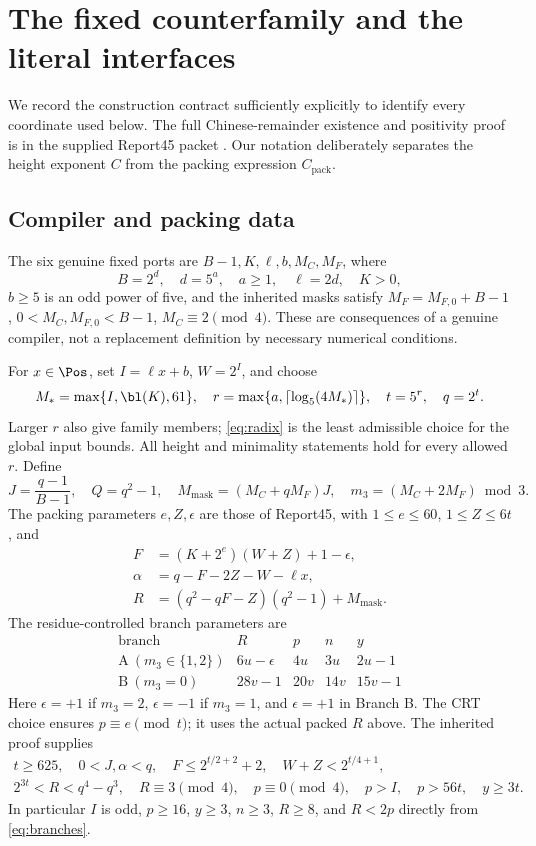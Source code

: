 \section{The fixed counterfamily and the literal interfaces}
\label{sec:setup}
We record the construction contract sufficiently explicitly to identify
every coordinate used below. The full Chinese-remainder existence and
positivity proof is in the supplied Report45 packet \cite{report45,base}.
Our notation deliberately separates the height exponent $C$ from the
packing expression $C_{\mathrm{pack}}$.

\subsection{Compiler and packing data}
The six genuine fixed ports are $B-1,K,\ell,b,M_C,M_F$, where
\[
 B=2^d,\quad d=5^a,\quad a\ge1,\quad \ell=2d,\quad K>0,
\]
$b\ge5$ is an odd power of five, and the inherited masks satisfy
$M_F=M_{F,0}+B-1$, $0<M_C,M_{F,0}<B-1$, $M_C\equiv2\pmod4$.
These are consequences of a genuine compiler, not a replacement
definition by necessary numerical conditions.

For $x\in\Pos$, set $I=\ell x+b$, $W=2^I$, and choose
\begin{equation}\label{eq:radix}
 M_*=\max\{I,\bl(K),61\},\quad
 r=\max\{a,\lceil\log_5(4M_*)\rceil\},\quad t=5^r,\quad q=2^t.
\end{equation}
Larger $r$ also give family members; \eqref{eq:radix} is the least
admissible choice for the global input bounds. All height and minimality
statements hold for every allowed $r$. Define
\[
 J=\frac{q-1}{B-1},\quad Q=q^2-1,\quad
 M_{\mathrm{mask}}=(M_C+qM_F)J,\quad m_3=(M_C+2M_F)\bmod3.
\]
The packing parameters $e,Z,\epsilon$ are those of Report45, with
$1\le e\le60$, $1\le Z\le6t$, and
\begin{align}
 F&=(K+2^e)(W+Z)+1-\epsilon,\label{eq:pack}\\
 \alpha&=q-F-2Z-W-\ell x,\nonumber\\
 R&=(q^2-qF-Z)(q^2-1)+M_{\mathrm{mask}}.\nonumber
\end{align}
The residue-controlled branch parameters are
\begin{equation}\label{eq:branches}
\begin{array}{c|c|c|c|c}
\text{branch}&R&p&n&y\\\hline
\mathrm A\ (m_3\in\{1,2\})&6u-\epsilon&4u&3u&2u-1\\
\mathrm B\ (m_3=0)&28v-1&20v&14v&15v-1
\end{array}
\end{equation}
Here $\epsilon=+1$ if $m_3=2$, $\epsilon=-1$ if $m_3=1$,
and $\epsilon=+1$ in Branch B. The CRT choice ensures
$p\equiv e\pmod t$; it uses the actual packed $R$ above.
The inherited proof supplies
\begin{gather}
 t\ge625,\quad 0<J,\alpha<q,\quad
 F\le 2^{t/2+2}+2,\quad W+Z<2^{t/4+1},\label{eq:outerbounds}\\
 2^{3t}<R<q^4-q^3,\quad R\equiv3\pmod4,\quad
 p\equiv0\pmod4,\quad p>I,\quad p>56t,\quad y\ge3t.\label{eq:rankbounds}
\end{gather}
In particular $I$ is odd, $p\ge16$, $y\ge3$, $n\ge3$, $R\ge8$,
and $R<2p$ directly from \eqref{eq:branches}.

